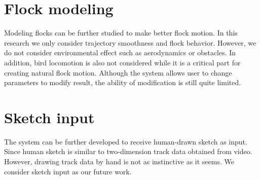 \section{Flock modeling}


Modeling flocks can be further studied to make better flock motion. In this research we only consider trajectory smoothness and flock behavior. However, we do not consider environmental effect such as aerodynamics or obstacles. In addition, bird locomotion is also not considered while it is a critical part for creating natural flock motion. 
Although the system allows user to change parameters to modify result, the ability of modification is still quite limited. 


\section{Sketch input}


The system can be further developed to receive human-drawn sketch as input. Since human sketch is similar to two-dimension track data obtained from video. However, drawing track data by hand is not as instinctive as it seems. We consider sketch input as our future work.